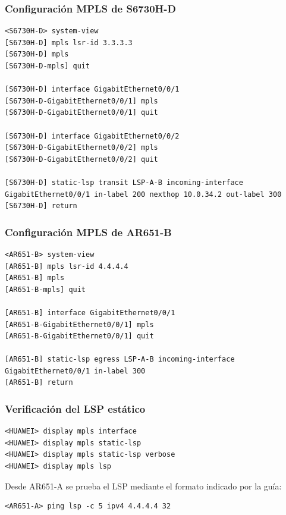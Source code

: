 \subsubsection{Configuración MPLS de S6730H-D}

\begin{lstlisting}[style=terminal]
<S6730H-D> system-view
[S6730H-D] mpls lsr-id 3.3.3.3
[S6730H-D] mpls
[S6730H-D-mpls] quit

[S6730H-D] interface GigabitEthernet0/0/1
[S6730H-D-GigabitEthernet0/0/1] mpls
[S6730H-D-GigabitEthernet0/0/1] quit

[S6730H-D] interface GigabitEthernet0/0/2
[S6730H-D-GigabitEthernet0/0/2] mpls
[S6730H-D-GigabitEthernet0/0/2] quit

[S6730H-D] static-lsp transit LSP-A-B incoming-interface GigabitEthernet0/0/1 in-label 200 nexthop 10.0.34.2 out-label 300
[S6730H-D] return
\end{lstlisting}

\subsubsection{Configuración MPLS de AR651-B}

\begin{lstlisting}[style=terminal]
<AR651-B> system-view
[AR651-B] mpls lsr-id 4.4.4.4
[AR651-B] mpls
[AR651-B-mpls] quit

[AR651-B] interface GigabitEthernet0/0/1
[AR651-B-GigabitEthernet0/0/1] mpls
[AR651-B-GigabitEthernet0/0/1] quit

[AR651-B] static-lsp egress LSP-A-B incoming-interface GigabitEthernet0/0/1 in-label 300
[AR651-B] return
\end{lstlisting}

\subsubsection{Verificación del LSP estático}

\begin{lstlisting}[style=terminal]
<HUAWEI> display mpls interface
<HUAWEI> display mpls static-lsp
<HUAWEI> display mpls static-lsp verbose
<HUAWEI> display mpls lsp
\end{lstlisting}

Desde AR651-A se prueba el LSP mediante el formato indicado por la guía:

\begin{lstlisting}[style=terminal]
<AR651-A> ping lsp -c 5 ipv4 4.4.4.4 32
\end{lstlisting}

